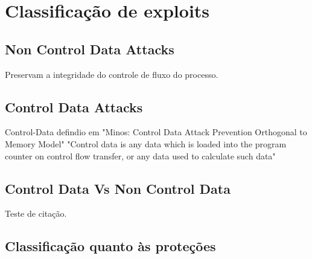 
\chapter{Classificação de exploits}
\label{chap:classificacao}

\section{Non Control Data Attacks}
Preservam a integridade do controle de fluxo do processo.

\section{Control Data Attacks}
	Control-Data defindio em "Minos: Control Data Attack Prevention Orthogonal to Memory Model"
	"Control data is any data which is loaded into the program counter on control flow transfer, 
	or any data used to calculate such data"

\section{Control Data Vs Non Control Data}
\cite{Anley:Shellcoders} Teste de citação.

\section{Classificação quanto às proteções}

